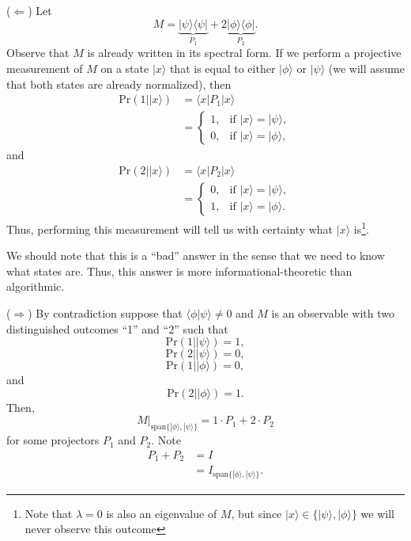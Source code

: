 \documentclass{article}
\newcommand{\ket}[1]{|#1\rangle}
\newcommand{\bra}[1]{\langle#1|}
\newcommand{\braket}[2]{\langle#1|#2\rangle}
\begin{document}
($\Leftarrow$) 
Let 
$$ M = \underbrace{\ket \psi \bra \psi}_{P_1} + 
   2 \underbrace{\ket \phi \bra \phi}_{P_2}.$$ 
Observe that $M$ is already written in its spectral form. 
If we perform a projective measurement of $M$ on a state $\ket x$ that
is equal to either $\ket \phi$ or $\ket \psi$ (we will
assume that both states are already normalized), then
\begin{align*}
     \mathrm{Pr}(1 | \ket x)    &= \braket{x | P_1}{x} \\
                                &= \begin{cases} 
                                        1, & \text{if } \ket x = \ket \psi, \\
                                        0, & \text{if } \ket x = \ket \phi,
                                   \end{cases}
\end{align*}
and
\begin{align*}
     \mathrm{Pr}(2 | \ket x) &= \braket{x | P_2}{x} \\
                             &= \begin{cases} 
                                   0, & \text{if } \ket x = \ket \psi, \\
                                   1, & \text{if } \ket x = \ket \phi.
                                \end{cases}
\end{align*}
Thus, performing this measurement will tell us with certainty
what $\ket x$ is\footnote{Note that $\lambda =0$ is also an eigenvalue 
of $M$, but since $\ket x \in \{ \ket \psi, \ket \phi\}$ we will 
never observe this outcome}.

We should note that this is a ``bad'' answer in the sense that we need to know
what states are. Thus, this answer is more informational-theoretic than
algorithmic.

($\Rightarrow$) By contradiction suppose that $\braket{\phi}{\psi} \neq 0$
and $M$ is an observable with two distinguished outcomes ``1'' and ``2''
such that 
$$ \mathrm{Pr}(1 | \ket \psi) = 1,$$
$$ \mathrm{Pr}(2 | \ket \psi) = 0,$$
$$ \mathrm{Pr}(1 | \ket \phi) = 0,$$
and
$$ \mathrm{Pr}(2 | \ket \phi) = 1.$$
Then, $$ M|_{\mathrm{span} \{ \ket \phi, \ket \psi\}} = 1 \cdot P_1 + 2 \cdot P_2$$
for some projectors $P_1$ and $P_2$. 
Note 
\begin{align*}
     P_1 + P_2 &= I \\
               &= I_{\mathrm{span}\{ \ket \phi, \ket \psi\}}.
\end{align*}
\end{document}
